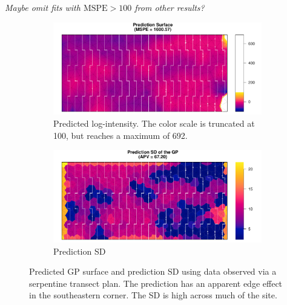 \documentclass[review]{elsarticle}
\begin{document}
\emph{Maybe omit fits with \(\mathrm{MSPE} > 100\) from other results?}


\begin{figure}

\begin{subfigure}{5in}
\includegraphics[width=5in]{../graphics/lambda-Serp000148-LGCP000004.pdf}
\caption{Predicted log-intensity. The color scale is truncated at 100, but
reaches a maximum of 692.}
\label{lambdaserp000148}
\end{subfigure}

\begin{subfigure}{5in}
\includegraphics[width=5in]{../graphics/lambdaSD-Serp000148-LGCP000004.pdf}
\caption{Prediction SD}
\label{sdserp000148}
\end{subfigure}

\caption{Predicted GP surface and prediction SD using data observed via a
serpentine transect plan. The prediction has an apparent edge effect in the
southeastern corner. The SD is high across much of the site.}
\label{serp000148}
\end{figure}
\end{document}
